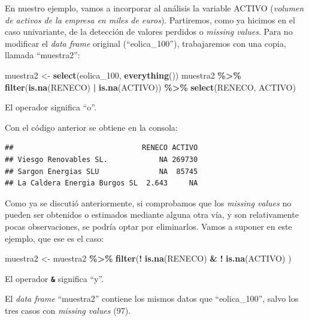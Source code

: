 \documentclass[
]{book}
\newenvironment{Shaded}{\begin{snugshade}}{\end{snugshade}}
\newcommand{\FunctionTok}[1]{\textcolor[rgb]{0.13,0.29,0.53}{\textbf{#1}}}
\newcommand{\NormalTok}[1]{#1}
\newcommand{\OtherTok}[1]{\textcolor[rgb]{0.56,0.35,0.01}{#1}}
\newcommand{\SpecialCharTok}[1]{\textcolor[rgb]{0.81,0.36,0.00}{\textbf{#1}}}
\begin{document}
En nuestro ejemplo, vamos a incorporar al análisis la variable ACTIVO (\emph{volumen de activos de la empresa en miles de euros}). Partiremos, como ya hicimos en el caso univariante, de la detección de valores perdidos o \emph{missing values}. Para no modificar el \emph{data frame} original (``eolica\_100''), trabajaremos con una copia, llamada ``muestra2'':

\begin{Shaded}
\begin{Highlighting}[]
\NormalTok{muestra2 }\OtherTok{\textless{}{-}} \FunctionTok{select}\NormalTok{(eolica\_100, }\FunctionTok{everything}\NormalTok{())}
\NormalTok{muestra2 }\SpecialCharTok{\%\textgreater{}\%} \FunctionTok{filter}\NormalTok{(}\FunctionTok{is.na}\NormalTok{(RENECO) }\SpecialCharTok{|} \FunctionTok{is.na}\NormalTok{(ACTIVO)) }\SpecialCharTok{\%\textgreater{}\%}
  \FunctionTok{select}\NormalTok{(RENECO, ACTIVO)}
\end{Highlighting}
\end{Shaded}

El operador \textbf{\texttt{\textbar{}}} significa ``o''.

Con el código anterior se obtiene en la consola:

\begin{verbatim}
##                              RENECO ACTIVO
## Viesgo Renovables SL.            NA 269730
## Sargon Energias SLU              NA  85745
## La Caldera Energia Burgos SL  2.643     NA
\end{verbatim}

Como ya se discutió anteriormente, si comprobamos que los \emph{missing values} no pueden ser obtenidos o estimados mediante alguna otra vía, y son relativamente pocas observaciones, se podría optar por eliminarlos. Vamos a suponer en este ejemplo, que ese es el caso:

\begin{Shaded}
\begin{Highlighting}[]
\NormalTok{muestra2 }\OtherTok{\textless{}{-}}\NormalTok{ muestra2 }\SpecialCharTok{\%\textgreater{}\%} \FunctionTok{filter}\NormalTok{(}\SpecialCharTok{!} \FunctionTok{is.na}\NormalTok{(RENECO) }\SpecialCharTok{\&} \SpecialCharTok{!} \FunctionTok{is.na}\NormalTok{(ACTIVO) )}
\end{Highlighting}
\end{Shaded}

El operador \textbf{\texttt{\&}} significa ``y''.

El \emph{data frame} ``muestra2'' contiene los mismos datos que ``eolica\_100'', salvo los tres casos con \emph{missing values} (97).
\end{document}
